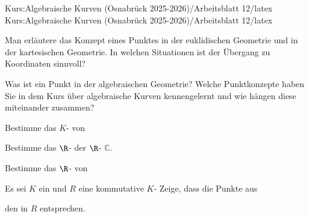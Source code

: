 Kurs:Algebraische Kurven (Osnabrück 2025-2026)/Arbeitsblatt 12/latex
Kurs:Algebraische Kurven (Osnabrück 2025-2026)/Arbeitsblatt 12/latex

\setcounter{section}{12}





{}

{


Man erläutere das Konzept eines Punktes in der euklidischen
 {} {}
Geometrie und in der kartesischen Geometrie. In welchen Situationen ist der Übergang zu Koordinaten sinnvoll?


}

{} {}



{}

{


Was ist ein Punkt in der algebraischen Geometrie? Welche Punktkonzepte haben Sie in dem Kurs über algebraische Kurven kennengelernt und wie hängen diese miteinander zusammen?


}

{} {}



{}

{


Bestimme das
$K$-
von



}

{} {}



{}

{


Bestimme das
$\R$-
der
$\R$-
${\mathbb C}$.


}

{} {}



{}

{


Bestimme das
$\R$-
von



}

{} {}



{}

{


Es sei $K$ ein
und $R$ eine kommutative
$K$-
Zeige, dass die Punkte aus

 den
in $R$ entsprechen.


}

